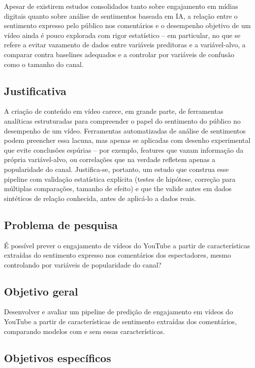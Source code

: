 \documentclass[12pt,a4paper]{article}
\begin{document}
Apesar de existirem estudos consolidados tanto sobre engajamento em mídias digitais quanto sobre análise de sentimentos baseada em IA, a relação entre o sentimento expresso pelo público nos comentários e o desempenho objetivo de um vídeo ainda é pouco explorada com rigor estatístico -- em particular, no que se refere a evitar vazamento de dados entre variáveis preditoras e a variável-alvo, a comparar contra baselines adequados e a controlar por variáveis de confusão como o tamanho do canal.

\subsection{Justificativa}

A criação de conteúdo em vídeo carece, em grande parte, de ferramentas analíticas estruturadas para compreender o papel do sentimento do público no desempenho de um vídeo. Ferramentas automatizadas de análise de sentimentos podem preencher essa lacuna, mas apenas se aplicadas com desenho experimental que evite conclusões espúrias -- por exemplo, features que vazam informação da própria variável-alvo, ou correlações que na verdade refletem apenas a popularidade do canal. Justifica-se, portanto, um estudo que construa esse pipeline com validação estatística explícita (testes de hipótese, correção para múltiplas comparações, tamanho de efeito) e que the valide antes em dados sintéticos de relação conhecida, antes de aplicá-lo a dados reais.

\subsection{Problema de pesquisa}

É possível prever o engajamento de vídeos do YouTube a partir de características extraídas do sentimento expresso nos comentários dos espectadores, mesmo controlando por variáveis de popularidade do canal?

\subsection{Objetivo geral}

Desenvolver e avaliar um pipeline de predição de engajamento em vídeos do YouTube a partir de características de sentimento extraídas dos comentários, comparando modelos com e sem essas características.

\subsection{Objetivos específicos}
\end{document}
